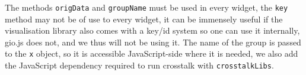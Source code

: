 \documentclass[
  10pt,
]{krantz}
\makeatletter
\newenvironment{Shaded}{\begin{snugshade}}{\end{snugshade}}
\newcommand{\CommentTok}[1]{\textcolor[rgb]{0.37,0.37,0.37}{\textit{#1}}}
\newcommand{\ControlFlowTok}[1]{\textcolor[rgb]{0.27,0.27,0.27}{\textbf{#1}}}
\newcommand{\DataTypeTok}[1]{\textcolor[rgb]{0.27,0.27,0.27}{#1}}
\newcommand{\KeywordTok}[1]{\textcolor[rgb]{0.27,0.27,0.27}{\textbf{#1}}}
\newcommand{\NormalTok}[1]{#1}
\newcommand{\OperatorTok}[1]{\textcolor[rgb]{0.43,0.43,0.43}{\textbf{#1}}}
\newcommand{\OtherTok}[1]{\textcolor[rgb]{0.37,0.37,0.37}{#1}}
\newcommand{\StringTok}[1]{\textcolor[rgb]{0.5,0.5,0.5}{#1}}
\newenvironment{kframe}{%
\medskip{}
\setlength{\fboxsep}{.8em}
 \def\at@end@of@kframe{}%
 \ifinner\ifhmode%
  \def\at@end@of@kframe{\end{minipage}}%
  \begin{minipage}{\columnwidth}%
 \fi\fi%
 \def\FrameCommand##1{\hskip\@totalleftmargin \hskip-\fboxsep
 \colorbox{shadecolor}{##1}\hskip-\fboxsep
     \hskip-\linewidth \hskip-\@totalleftmargin \hskip\columnwidth}%
 \MakeFramed {\advance\hsize-\width
   \@totalleftmargin\z@ \linewidth\hsize
   \@setminipage}}%
 {\par\unskip\endMakeFramed%
 \at@end@of@kframe}
\renewenvironment{Shaded}{\begin{kframe}}{\end{kframe}}
\makeatother
\begin{document}
The methods \texttt{origData} and \texttt{groupName} must be used in every widget, the \texttt{key} method may not be of use to every widget, it can be immensely useful if the visualisation library also comes with a key/id system so one can use it internally, gio.js does not, and we thus will not be using it. The name of the group is passed to the \texttt{x} object, so it is accessible JavaScript-side where it is needed, we also add the JavaScript dependency required to run crosstalk with \texttt{crosstalkLibs}.

\begin{Shaded}
\end{Shaded}
\end{document}
